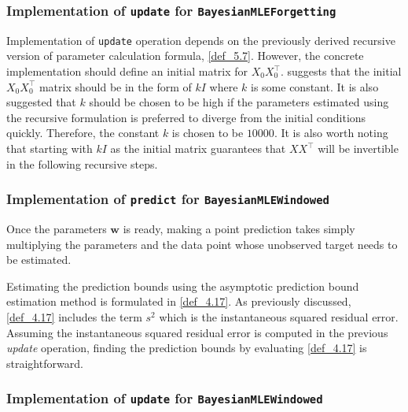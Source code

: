 \subsubsection{Implementation of \texttt{update} for \texttt{BayesianMLEForgetting}}
\label{subsubsection_impl_update_bmleforgetting}

Implementation of \texttt{update} operation depends on the previously derived recursive version of parameter calculation formula, \ref{def_5.7}. However, the concrete implementation should define an initial matrix for $X_0X_0^{\top}$. \citep[pp. 162-163]{bontempi_statistical_2011} suggests that the initial $X_0X_0^{\top}$ matrix should be in the form of $kI$ where $k$ is some constant. It is also suggested that $k$ should be chosen to be high if the parameters estimated using the recursive formulation is preferred to diverge from the initial conditions quickly. Therefore, the constant $k$ is chosen to be $10000$. It is also worth noting that starting with $kI$ as the initial matrix guarantees that $XX^{\top}$ will be invertible in the following recursive steps.

\subsubsection{Implementation of \texttt{predict} for \texttt{BayesianMLEWindowed}}

Once the parameters $\pmb{w}$ is ready, making a point prediction takes simply multiplying the parameters and the data point whose unobserved target needs to be estimated.

Estimating the prediction bounds using the asymptotic prediction bound estimation method is formulated in \ref{def_4.17}. As previously discussed, \ref{def_4.17} includes the term $s^2$ which is the instantaneous squared residual error. Assuming the instantaneous squared residual error is computed in the previous \textit{update} operation, finding the prediction bounds by evaluating \ref{def_4.17} is straightforward.

\subsubsection{Implementation of \texttt{update} for \texttt{BayesianMLEWindowed}}
\label{subsubsection:update_bmlewindowed}

